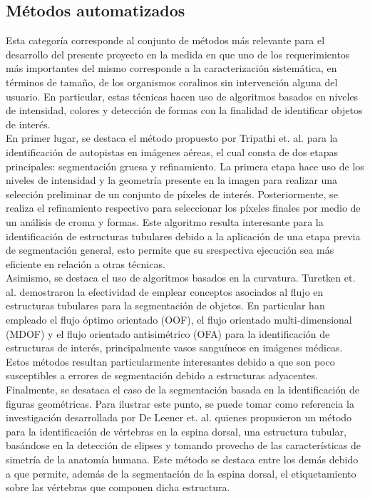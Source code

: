 \documentclass[journal]{IEEEtran}
\begin{document}
\subsection{Métodos automatizados}
Esta categoría corresponde al conjunto de métodos más relevante para el desarrollo del
presente proyecto en la medida en que uno de los requerimientos más importantes del mismo
corresponde a la caracterización sistemática, en términos de tamaño, de los organismos
coralinos sin intervención alguna del usuario. En particular, estas técnicas hacen uso de
algoritmos basados en niveles de intensidad, colores y detección de formas con la
finalidad de identificar objetos de interés. \\

En primer lugar, se destaca el método propuesto por Tripathi et. al. \cite{autopistas}
para la identificación de autopistas en imágenes aéreas, el cual consta de dos etapas
principales: segmentación gruesa y refinamiento. La primera etapa hace uso de los niveles
de intensidad y la geometría presente en la imagen para realizar una selección preliminar
de un conjunto de píxeles de interés. Posteriormente, se realiza el refinamiento
respectivo para seleccionar los píxeles finales por medio de un análisis de croma y
formas. Este algoritmo resulta interesante para la identificación de estructuras
tubulares debido a la aplicación de una etapa previa de segmentación general, esto
permite que su srespectiva ejecución sea más eficiente en relación a otras técnicas. \\

Asimismo, se destaca el uso de algoritmos basados en la curvatura. Turetken et. al.
\cite{flujo} demostraron la efectividad de emplear conceptos asociados al flujo en
estructuras tubulares para la segmentación de objetos. En particular han empleado el
flujo óptimo orientado (OOF), el flujo orientado multi-dimensional (MDOF) y el flujo
orientado antisimétrico (OFA) para la identificación de estructuras de interés,
principalmente vasos sanguíneos en imágenes médicas. Estos métodos resultan
particularmente interesantes debido a que son poco susceptibles a errores de segmentación
debido a estructuras adyacentes.\\

Finalmente, se desataca el caso de la segmentación basada en la identificación de figuras
geométricas. Para ilustrar este punto, se puede tomar como referencia la investigación
desarrollada por De Leener et. al. \cite{espina} quienes propusieron un método para la
identificación de vértebras en la espina dorsal, una estructura tubular, basándose en la
detección de elipses y tomando provecho de las características de simetría de la anatomía
humana. Este método se destaca entre los demás debido a que permite, además de la
segmentación de la espina dorsal, el etiquetamiento sobre las vértebras que componen
dicha estructura.\\
\end{document}
